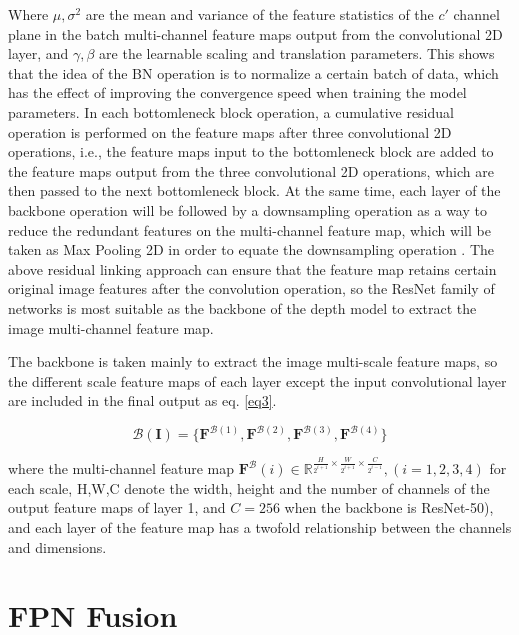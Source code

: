 Where $\mu,\sigma^2$ are the mean and variance of the feature statistics of the $c'$ channel plane in the batch multi-channel feature maps output from the convolutional 2D layer, and $\gamma, \beta$ are the learnable scaling and translation parameters. This shows that the idea of the BN operation is to normalize a certain batch of data, which has the effect of improving the convergence speed when training the model parameters. In each bottomleneck block operation, a cumulative residual operation is performed on the feature maps after three convolutional 2D operations, i.e., the feature maps input to the bottomleneck block are added to the feature maps output from the three convolutional 2D operations, which are then passed to the next bottomleneck block. At the same time, each layer of the backbone operation will be followed by a downsampling operation as a way to reduce the redundant features on the multi-channel feature map, which will be taken as Max Pooling 2D in order to equate the downsampling operation \cite{14}. The above residual linking approach can ensure that the feature map retains certain original image features after the convolution operation, so the ResNet family of networks is most suitable as the backbone of the depth model to extract the image multi-channel feature map.

The backbone is taken mainly to extract the image multi-scale feature maps, so the different scale feature maps of each layer except the input convolutional layer are included in the final output as eq. \ref{eq3}.

\begin{equation}
\label{eq3}
  \mathcal{B}(\mathbf{I}) = \{ \mathbf{F}^{\mathcal{B}(1)}, \mathbf{F}^{\mathcal{B}(2)}, \mathbf{F}^{\mathcal{B}(3)}, \mathbf{F}^{\mathcal{B}(4)} \}
\end{equation}

where the multi-channel feature map $\mathbf{F}^\mathcal{B}(i) \in \mathbb{R}^{\frac{H}{2^{i+1}} \times \frac{W}{2^{i+1}} \times \frac{C}{2^{i-1}}},(i=1,2,3,4)$ for each scale, H,W,C denote the width, height and the number of channels of the output feature maps of layer 1, and $C=256$ when the backbone is ResNet-50), and each layer of the feature map has a twofold relationship between the channels and dimensions.

\section{FPN Fusion}

